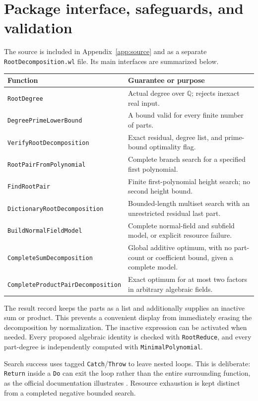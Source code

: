\documentclass[11pt,a4paper]{article}
\theoremstyle{definition}\newtheorem{definition}[theorem]{Definition}
\theoremstyle{remark}\newtheorem{remark}[theorem]{Remark}
\newcommand{\Q}{\mathbb{Q}}\newcommand{\C}{\mathbb{C}}
\newcommand{\code}[1]{\texttt{#1}}
\begin{document}
\section{Package interface, safeguards, and validation}
\label{sec:validation}
The source is included in Appendix~\ref{app:source} and as a separate \code{RootDecomposition.wl} file. Its main interfaces are summarized below.
\begin{longtable}{@{}p{}p{}@{}}
\toprule
Function & Guarantee or purpose\\\midrule
\endhead
\code{RootDegree} & Actual degree over $\Q$; rejects inexact real input.\\
\code{DegreePrimeLowerBound} & A bound valid for every finite number of parts.\\
\code{VerifyRootDecomposition} & Exact residual, degree list, and prime-bound optimality flag.\\
\code{RootPairFromPolynomial} & Complete branch search for a specified first polynomial.\\
\code{FindRootPair} & Finite first-polynomial height search; no second height bound.\\
\code{DictionaryRootDecomposition} & Bounded-length multiset search with an unrestricted residual last part.\\
\code{BuildNormalFieldModel} & Complete normal-field and subfield model, or explicit resource failure.\\
\code{CompleteSumDecomposition} & Global additive optimum, with no part-count or coefficient bound, given a complete model.\\
\code{CompleteProductPairDecomposition} & Exact optimum for at most two factors in arbitrary algebraic fields.\\
\bottomrule
\end{longtable}

The result record keeps the parts as a list and additionally supplies an inactive sum or product. This prevents a convenient display from immediately erasing the decomposition by normalization. The inactive expression can be activated when needed. Every proposed algebraic identity is checked with \code{RootReduce}, and every part-degree is independently computed with \code{MinimalPolynomial}.

Search success uses tagged \code{Catch}/\code{Throw} to leave nested loops. This is deliberate: \code{Return} inside a \code{Do} can exit the loop rather than the entire surrounding function, as the official documentation illustrates \cite{return}. Resource exhaustion is kept distinct from a completed negative bounded search.
\end{document}
